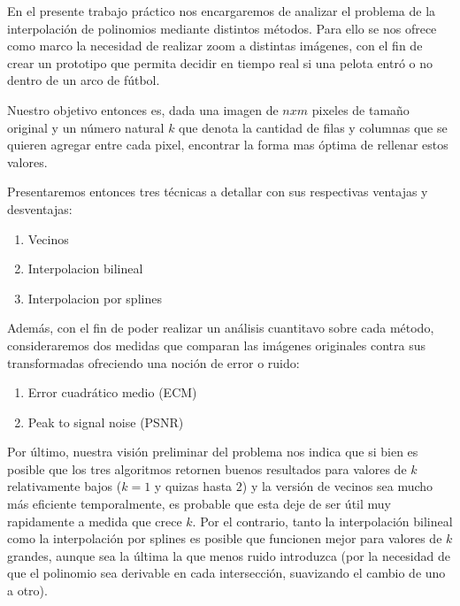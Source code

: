 En el presente trabajo práctico nos encargaremos de analizar el problema de la interpolación de polinomios mediante distintos métodos.
Para ello se nos ofrece como marco la necesidad de realizar zoom a distintas imágenes, con el fin de crear un prototipo que permita decidir en tiempo
real si una pelota entró o no dentro de un arco de fútbol.

Nuestro objetivo entonces es, dada una imagen de $n x m$ pixeles de tamaño original y un número natural $k$ que denota la cantidad de filas y
columnas que se quieren agregar entre cada pixel, encontrar la forma mas óptima de rellenar estos valores.

Presentaremos entonces tres técnicas a detallar con sus respectivas ventajas y desventajas:
\begin{enumerate}
 \item Vecinos
 \item Interpolacion bilineal
 \item Interpolacion por splines
\end{enumerate}

Además, con el fin de poder realizar un análisis cuantitavo sobre cada método, consideraremos dos medidas que comparan las imágenes
originales contra sus transformadas ofreciendo una noción de error o ruido:
\begin{enumerate}
 \item Error cuadrático medio (ECM)
 \item Peak to signal noise (PSNR)
\end{enumerate}

Por último, nuestra visión preliminar del problema nos indica que si bien es posible que los tres algoritmos retornen buenos resultados
para valores de $k$ relativamente bajos ($k = 1$ y quizas hasta $2$) y la versión de vecinos sea mucho más eficiente temporalmente,
es probable que esta deje de ser útil muy rapidamente a medida que crece $k$. Por el contrario, tanto la interpolación bilineal como la
interpolación por splines es posible que funcionen mejor para valores de $k$ grandes, aunque sea la última la que menos ruido introduzca
(por la necesidad de que el polinomio sea derivable en cada intersección, suavizando el cambio de uno a otro).
